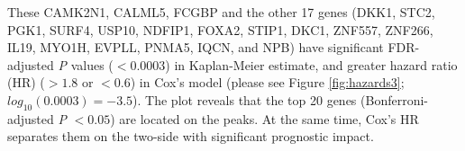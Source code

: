 \documentclass[jpm,article,submit,moreauthors,pdftex]{Definitions/mdpi}
\newenvironment{MyColorPar}[1]{%
    \leavevmode\color{#1}\ignorespaces%
}{%
}%
\begin{document}
\begin{MyColorPar}{red}
These CAMK2N1, CALML5, FCGBP and the other 17 genes (DKK1, STC2, PGK1, SURF4, USP10, NDFIP1, FOXA2, STIP1, DKC1, ZNF557, ZNF266, IL19, MYO1H, EVPLL, PNMA5, IQCN, and NPB) have significant FDR-adjusted \textit{P} values ($< 0.0003$) in Kaplan-Meier estimate, and greater hazard ratio (HR) ($> 1.8$ or $< 0.6$) in Cox's model (please see Figure \ref{fig:hazards3}; $log_{10}(0.0003) = -3.5$).
The plot reveals that the top 20 genes (Bonferroni-adjusted \textit{P} $< 0.05$) are located on the peaks. At the same time, Cox's HR separates them on the two-side with significant prognostic impact.


\end{MyColorPar}
\end{document}
